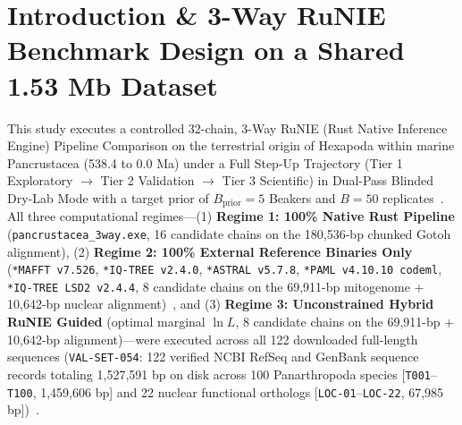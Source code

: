 \documentclass[10pt,letterpaper]{article}
\begin{document}
\section{Introduction \& 3-Way RuNIE Benchmark Design on a Shared 1.53 Mb Dataset}
This study executes a controlled 32-chain, 3-Way RuNIE (Rust Native Inference Engine) Pipeline Comparison on the terrestrial origin of Hexapoda within marine Pancrustacea (538.4 to 0.0 Ma) under a Full Step-Up Trajectory (Tier 1 Exploratory $\rightarrow$ Tier 2 Validation $\rightarrow$ Tier 3 Scientific) in Dual-Pass Blinded Dry-Lab Mode with a target prior of $B_{\text{prior}} = 5$ Beakers and $B = 50$ replicates~\cite{White2026RuNIE}. All three computational regimes---(1) \textbf{Regime 1: 100\% Native Rust Pipeline} (\texttt{pancrustacea\_3way.exe}, 16 candidate chains on the 180,536-bp chunked Gotoh alignment), (2) \textbf{Regime 2: 100\% External Reference Binaries Only} (\texttt{*MAFFT v7.526}, \texttt{*IQ-TREE v2.4.0}, \texttt{*ASTRAL v5.7.8}, \texttt{*PAML v4.10.10 codeml}, \texttt{*IQ-TREE LSD2 v2.4.4}, 8 candidate chains on the 69,911-bp mitogenome + 10,642-bp nuclear alignment)~\cite{Katoh2013,Minh2020}, and (3) \textbf{Regime 3: Unconstrained Hybrid RuNIE Guided} (optimal marginal $\ln L$, 8 candidate chains on the 69,911-bp + 10,642-bp alignment)---were executed across all 122 downloaded full-length sequences (\texttt{VAL-SET-054}: 122 verified NCBI RefSeq and GenBank sequence records totaling 1,527,591 bp on disk across 100 Panarthropoda species [\texttt{T001}--\texttt{T100}, 1,459,606 bp] and 22 nuclear functional orthologs [\texttt{LOC-01}--\texttt{LOC-22}, 67,985 bp])~\cite{Misof2014,Schwentner2017,LozanoFernandez2019,Oakley2013,Regier2010,vonReumont2012,RotaStabelli2013}.
\end{document}
